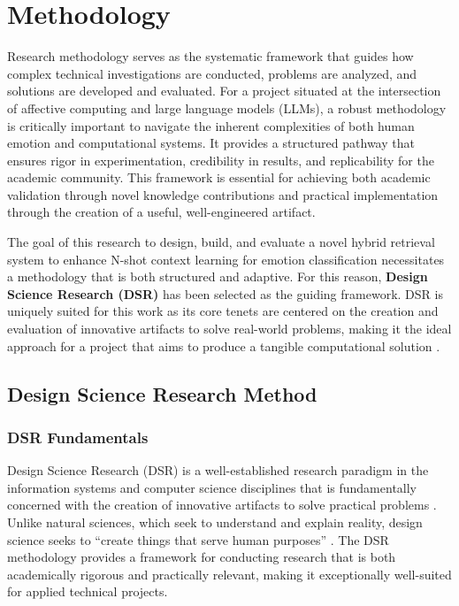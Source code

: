\chapter{Methodology}
\label{chap:methodology}

Research methodology serves as the systematic framework that guides how complex technical investigations are conducted, problems are analyzed, and solutions are developed and evaluated. For a project situated at the intersection of affective computing and large language models (LLMs), a robust methodology is critically important to navigate the inherent complexities of both human emotion and computational systems. It provides a structured pathway that ensures rigor in experimentation, credibility in results, and replicability for the academic community. This framework is essential for achieving both academic validation through novel knowledge contributions and practical implementation through the creation of a useful, well-engineered artifact. 

The goal of this research to design, build, and evaluate a novel hybrid retrieval system to enhance N-shot context learning for emotion classification necessitates a methodology that is both structured and adaptive. For this reason, \textbf{Design Science Research (DSR)} has been selected as the guiding framework. DSR is uniquely suited for this work as its core tenets are centered on the creation and evaluation of innovative artifacts to solve real-world problems, making it the ideal approach for a project that aims to produce a tangible computational solution \cite{hevner2004design,peffers2007dsr}.

\section{Design Science Research Method}
\label{sec:dsrm-overview}

\subsection{DSR Fundamentals}
Design Science Research (DSR) is a well-established research paradigm in the information systems and computer science disciplines that is fundamentally concerned with the creation of innovative artifacts to solve practical problems \cite{hevner2004design}. Unlike natural sciences, which seek to understand and explain reality, design science seeks to ``create things that serve human purposes'' \cite{simon1996sciences}. The DSR methodology provides a framework for conducting research that is both academically rigorous and practically relevant, making it exceptionally well-suited for applied technical projects. 

